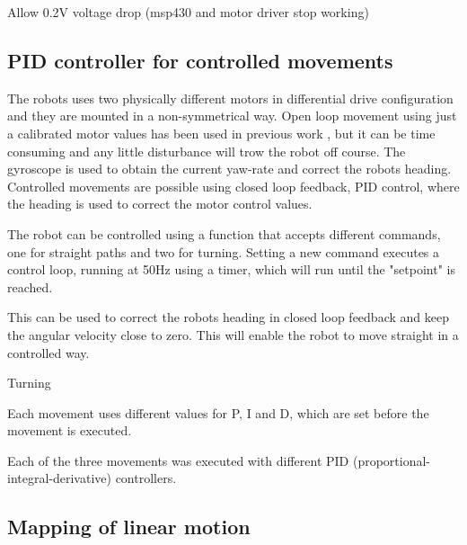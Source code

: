Allow 0.2V voltage drop (msp430 and motor driver stop working)


 


\subsection{PID controller for controlled movements}





The robots uses two physically different motors in differential drive configuration and they are mounted in a non-symmetrical way.
Open loop movement using just a calibrated motor values has been used in previous work \cite{legoc_uist_2016}, but it can be time consuming and any little disturbance will trow the robot off course.
The gyroscope is used to obtain the current yaw-rate and correct the robots heading.
Controlled movements are possible using closed loop feedback, PID control, where the heading is used to correct the motor control values.

The robot can be controlled using a function that accepts different commands, one for straight paths and two for turning.
Setting a new command executes a control loop, running at 50Hz using a timer, which will run until the "setpoint" is reached.











This can be used to correct the robots heading in closed loop feedback and keep the angular velocity close to zero.
This will enable the robot to move straight in a controlled way.


Turning 


Each movement uses different values for P, I and D, which are set before the movement is executed.

Each of the three movements was executed with different PID (proportional-integral-derivative) controllers. 





\subsection{Mapping of linear motion}